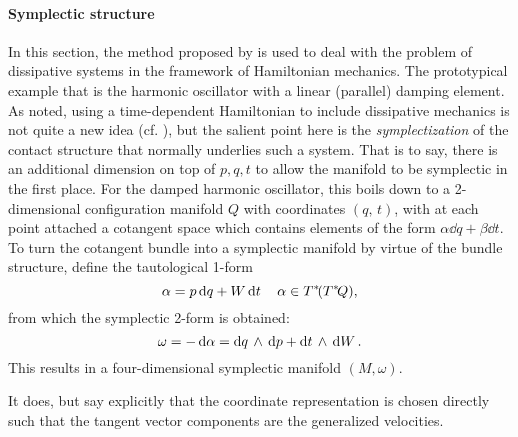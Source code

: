 \paragraph{Symplectic structure} In this section, the method proposed by \citet{Mendel2021} is used to deal with the problem of dissipative systems in the framework of Hamiltonian mechanics. The prototypical example that is the harmonic oscillator with a linear (parallel) damping element. As noted, using a time-dependent Hamiltonian to include dissipative mechanics is not quite a new idea (cf. \citet{Dekker1981}), but the salient point here is the \emph{symplectization} of the contact structure that normally underlies such a system. That is to say, there is an additional dimension on top of $p, q, t$ to allow the manifold to be symplectic in the first place. For the damped harmonic oscillator, this boils down to a 2-dimensional configuration manifold $Q$ with coordinates $(q,\,t)$, with at each point attached a cotangent space which contains elements of the form $\alpha\dd{q} + \beta\dd{t}$. To turn the cotangent bundle into a symplectic manifold by virtue of the bundle structure, define the tautological 1-form
$$ \alpha = p\dd{q} + W\dd{t} \quad \alpha \in T^*\!(T^*\!Q),$$
from which the symplectic 2-form is obtained:
$$ \omega = -\dd{\alpha} =  \dd{q}\,\wedge\,\dd{p}  +  \dd{t}\,\wedge\,\dd{W} .$$
This results in a four-dimensional symplectic manifold $(M, \omega)$. 

It does, but say explicitly that the coordinate representation is chosen directly such that the tangent vector components are the generalized velocities. 

